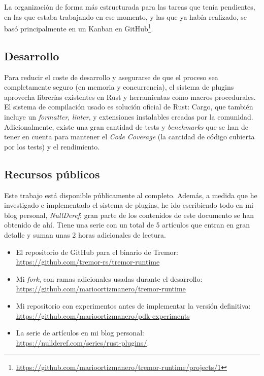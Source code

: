La organización de forma más estructurada para las tareas que tenía pendientes,
en las que estaba trabajando en ese momento, y las que ya había realizado, se
basó principalmente en un Kanban en
GitHub\footnote{\url{https://github.com/marioortizmanero/tremor-runtime/projects/1}}.

\subsection{Desarrollo}

Para reducir el coste de desarrollo y asegurarse de que el proceso sea
completamente seguro (en memoria y concurrencia), el sistema de plugins
aprovecha librerías existentes en Rust y herramientas como macros procedurales.
El sistema de compilación usado es solución oficial de Rust: Cargo, que también
incluye un \emph{formatter}, \emph{linter}, y extensiones instalables creadas
por la comunidad. Adicionalmente, existe una gran cantidad de tests y
\emph{benchmarks} que se han de tener en cuenta para mantener el \emph{Code
Coverage} (la cantidad de código cubierta por los tests) y el rendimiento.

\subsection{Recursos públicos}

Este trabajo está disponible públicamente al completo. Además, a medida que he
investigado e implementado el sistema de plugins, he ido escribiendo todo en mi
blog personal, \emph{NullDeref}; gran parte de los contenidos de este documento
se han obtenido de ahí. Tiene una serie con un total de 5 artículos que entran
en gran detalle y suman unas 2 horas adicionales de lectura.

\begin{itemize}
    \item El repositorio de GitHub para el binario de Tremor:\\
        \url{https://github.com/tremor-rs/tremor-runtime}
    \item Mi \emph{fork}, con ramas adicionales usadas durante el desarrollo:\\
        \url{https://github.com/marioortizmanero/tremor-runtime}
    \item Mi repositorio con experimentos antes de implementar la versión
        definitiva:\\
        \url{https://github.com/marioortizmanero/pdk-experiments}
    \item La serie de artículos en mi blog personal:\\
        \url{https://nullderef.com/series/rust-plugins/}.
\end{itemize}


